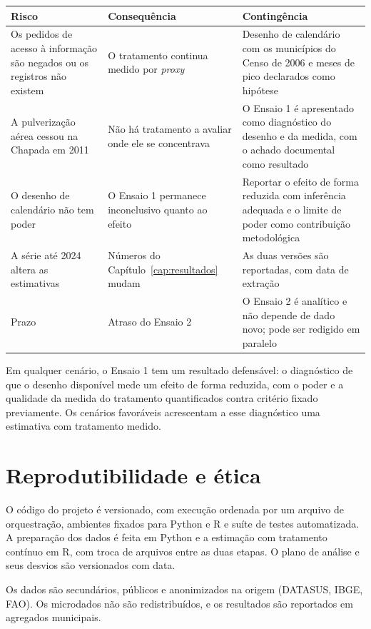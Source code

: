 \begin{quadro}[htb]
\centering
\caption{Riscos e contingências}
\label{qua:riscos}
\small
\begin{tabular}{|p{4.4cm}|p{4.2cm}|p{5.5cm}|}
\hline
\textbf{Risco} & \textbf{Consequência} & \textbf{Contingência} \\
\hline
Os pedidos de acesso à informação são negados ou os registros não existem
  & O tratamento continua medido por \emph{proxy}
  & Desenho de calendário com os municípios do Censo de 2006 e meses de pico
    declarados como hipótese \\
\hline
A pulverização aérea cessou na Chapada em 2011
  & Não há tratamento a avaliar onde ele se concentrava
  & O Ensaio 1 é apresentado como diagnóstico do desenho e da medida, com o
    achado documental como resultado \\
\hline
O desenho de calendário não tem poder
  & O Ensaio 1 permanece inconclusivo quanto ao efeito
  & Reportar o efeito de forma reduzida com inferência adequada e o limite de
    poder como contribuição metodológica \\
\hline
A série até 2024 altera as estimativas
  & Números do Capítulo~\ref{cap:resultados} mudam
  & As duas versões são reportadas, com data de extração \\
\hline
Prazo
  & Atraso do Ensaio 2
  & O Ensaio 2 é analítico e não depende de dado novo; pode ser redigido em
    paralelo \\
\hline
\end{tabular}
\end{quadro}

Em qualquer cenário, o Ensaio 1 tem um resultado defensável: o diagnóstico de
que o desenho disponível mede um efeito de forma reduzida, com o poder e a
qualidade da medida do tratamento quantificados contra critério fixado
previamente. Os cenários favoráveis acrescentam a esse diagnóstico uma
estimativa com tratamento medido.

\section{Reprodutibilidade e ética}
\label{sec:reprodutibilidade}

O código do projeto é versionado, com execução ordenada por um arquivo de
orquestração, ambientes fixados para Python e R e suíte de testes automatizada.
A preparação dos dados é feita em Python e a estimação com tratamento contínuo
em R, com troca de arquivos entre as duas etapas. O plano de análise e seus
desvios são versionados com data.

Os dados são secundários, públicos e anonimizados na origem (DATASUS, IBGE,
FAO). Os microdados não são redistribuídos, e os resultados são reportados em
agregados municipais. 
